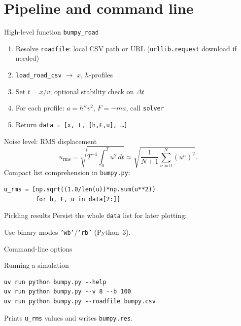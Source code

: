 \section{Pipeline and command line}

\begin{frame}{High-level function \texttt{bumpy\_road}}
  \begin{enumerate}
    \item Resolve \texttt{roadfile}: local CSV path or URL
          (\texttt{urllib.request} download if needed)
    \item \texttt{load\_road\_csv} $\to$ $x$, $h$-profiles
    \item Set $t = x/v$; optional stability check on $\Delta t$
    \item For each profile: $a=h''v^2$, $F=-ma$, call \texttt{solver}
    \item Return \texttt{data = [x, t, [h,F,u], \ldots]}
  \end{enumerate}
\end{frame}

\begin{frame}[fragile]{Noise level: RMS displacement}
  \[
  u_{\mathrm{rms}}
  = \sqrt{T^{-1}\int_0^T u^2\,dt}
  \approx
  \sqrt{\frac{1}{N+1}\sum_{n=0}^{N} (u^n)^2}.
  \]
  Compact list comprehension in \texttt{bumpy.py}:
\begin{lstlisting}[style=pythoncompact]
u_rms = [np.sqrt((1.0/len(u))*np.sum(u**2))
         for h, F, u in data[2:]]
\end{lstlisting}
\end{frame}

\begin{frame}[fragile]{Pickling results}
  Persist the whole \texttt{data} list for later plotting:
  
  Use binary modes \texttt{'wb'}/\texttt{'rb'} (Python~3).
\end{frame}

\begin{frame}[fragile]{Command-line options}
  
\end{frame}

\begin{frame}[fragile]{Running a simulation}
\begin{lstlisting}[style=terminal]
uv run python bumpy.py --help
uv run python bumpy.py --v 8 --b 100
uv run python bumpy.py --roadfile bumpy.csv
\end{lstlisting}
  Prints \texttt{u\_rms} values and writes \texttt{bumpy.res}.
\end{frame}
